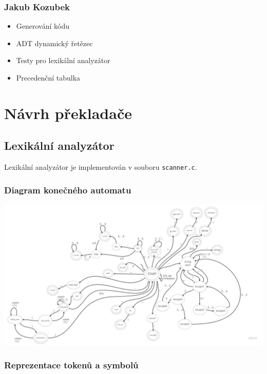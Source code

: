 \documentclass[a4paper]{article}
\theoremstyle{definition}
\begin{document}
\subsubsection{Jakub Kozubek}

\begin{itemize}
	\item Generování kódu
	
	\item ADT dynamický řetězec

	\item Testy pro lexikální analyzátor

	\item Precedenční tabulka
\end{itemize}

\newpage

\section{Návrh překladače}



\subsection{Lexikální analyzátor}

Lexikální analyzátor je implementován v souboru \texttt{scanner.c}.


\subsubsection{Diagram konečného automatu}

\includegraphics[width=\linewidth]{./inc/automaton.pdf}

\subsubsection{Reprezentace tokenů a symbolů}
\end{document}
